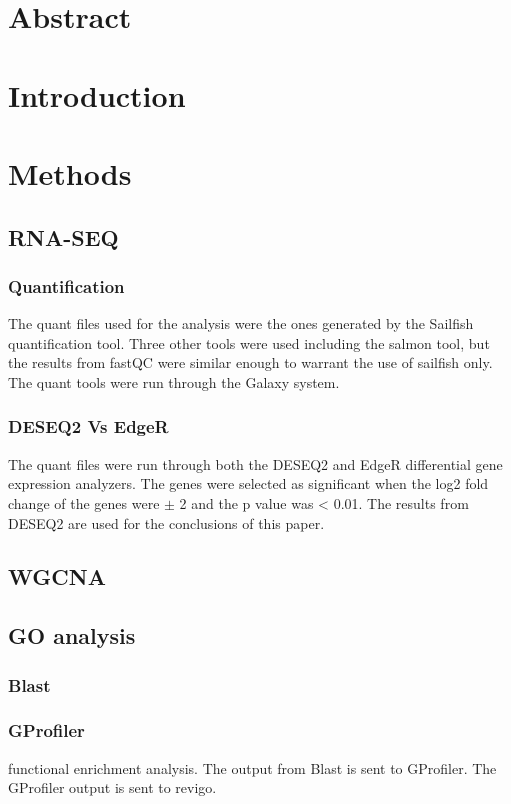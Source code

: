 \documentclass[11pt]{article}
\author{David Lewis}
\date{\today}
\title{}
\begin{document}
\tableofcontents

\section{Abstract}
\label{sec:org52343fb}
\section{Introduction}
\label{sec:orgb459187}
\section{Methods}
\label{sec:org2e03ff4}
\subsection{RNA-SEQ}
\label{sec:orgc609234}
\subsubsection{Quantification}
\label{sec:org753876c}
The quant files used for the analysis were the ones generated by the Sailfish quantification tool.
Three other tools were used including the salmon tool, but the results from fastQC were similar enough to
warrant the use of sailfish only. The quant tools were run through the Galaxy system.
\subsubsection{DESEQ2 Vs EdgeR}
\label{sec:orge9a89da}
The quant files were run through both the DESEQ2 and EdgeR differential gene expression analyzers.
The genes were selected as significant when the log2 fold change of the genes were \(\pm\) 2 and the p value was < 0.01. The results from DESEQ2 are used for the conclusions of this paper.
\subsection{WGCNA}
\label{sec:orgbb507c5}
\subsection{GO analysis}
\label{sec:org50ae625}
\subsubsection{Blast}
\label{sec:org4a972d3}

\subsubsection{GProfiler}
\label{sec:org650badf}
functional enrichment analysis. The output from Blast is sent to GProfiler. The GProfiler output is sent to revigo.
\end{document}
